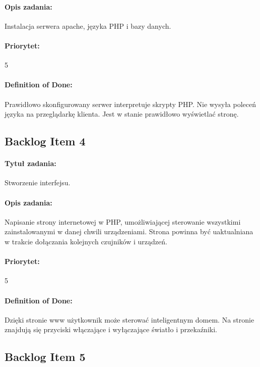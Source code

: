 \paragraph{Opis zadania:}
Instalacja serwera apache, języka PHP i bazy danych.

\paragraph{Priorytet:}
5

\paragraph{Definition of Done:}
Prawidłowo skonfigurowany serwer interpretuje skrypty PHP. Nie wysyła poleceń języka na przeglądarkę klienta. Jest w stanie prawidłowo wyświetlać stronę.


	\subsection{Backlog Item 4}
	\paragraph{Tytuł zadania:}
	Stworzenie interfejsu.
	
	\paragraph{Opis zadania:}
	Napisanie strony internetowej w PHP, umożliwiającej sterowanie wszystkimi zainstalowanymi w danej chwili urządzeniami. Strona powinna być uaktualniana w trakcie dołączania kolejnych czujników i urządzeń.
	
	\paragraph{Priorytet:}
	5
	
	\paragraph{Definition of Done:}
	Dzięki stronie www użytkownik może sterować inteligentnym domem. Na stronie znajdują się przyciski włączające i wyłączające światło i przekaźniki.


	\subsection{Backlog Item 5}
